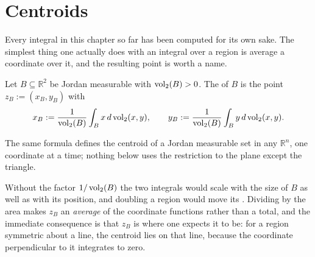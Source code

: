 
\section{Centroids}
\label{sec:centroids}

Every integral in this chapter so far has been computed for its own sake. The simplest thing one
actually does with an integral over a region is average a coordinate over it, and the resulting
point is worth a name.

\begin{definition}
\label{def:centroid}
Let $B \subseteq \mathbb{R}^2$ be Jordan measurable with $\operatorname{vol}_2(B) > 0$. The 
 of $B$ is the point $z_B := (x_B, y_B)$ with
\[x_B := \frac{1}{\operatorname{vol}_2(B)}\int_B x \,d\operatorname{vol}_2(x,y), \qquad
  y_B := \frac{1}{\operatorname{vol}_2(B)}\int_B y \,d\operatorname{vol}_2(x,y).\]
\end{definition}

The same formula defines the centroid of a Jordan measurable set in any $\mathbb{R}^n$, one
coordinate at a time; nothing below uses the restriction to the plane except the triangle.

\begin{remark}
Without the factor $1/\operatorname{vol}_2(B)$ the two integrals would scale with the size of $B$ as well as
with its position, and doubling a region would move its . Dividing by the area makes
$z_B$ an \emph{average} of the coordinate functions rather than a total, and the immediate
consequence is that $z_B$ is where one expects it to be: for a region symmetric about a line, the
centroid lies on that line, because the coordinate perpendicular to it integrates to zero.
\end{remark}

